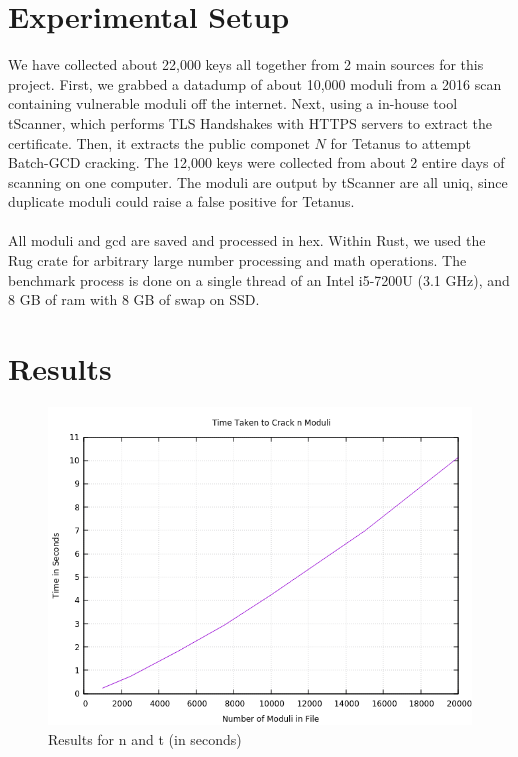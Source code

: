 \documentclass[10pt, letterpaper]{article}
\begin{document}
\section{Experimental Setup}
We have collected about 22,000 keys all together from 2 main sources for this project. First, we grabbed a datadump of about 10,000 moduli from a 2016 scan containing vulnerable moduli off the internet. Next, using a in-house tool tScanner, which performs TLS Handshakes with HTTPS servers to extract the certificate. Then, it extracts the public componet $N$ for Tetanus to attempt Batch-GCD cracking. The 12,000 keys were collected from about 2 entire days of scanning on one computer. The moduli are output by tScanner are all uniq, since duplicate moduli could raise a false positive for Tetanus.\\
\\
All moduli and gcd are saved and processed in hex. Within Rust, we used the Rug crate for arbitrary large number processing and math operations. The benchmark process is done on a single thread of an Intel i5-7200U (3.1 GHz), and 8 GB of ram with 8 GB of swap on SSD. 

\section{Results}
\begin{figure}[htp]
  \begin{center}
    \includegraphics[scale=0.8]{batch-gcd-time.png}
    \caption{Results for n and t (in seconds)}
  \end{center}
\end{figure}
\end{document}

